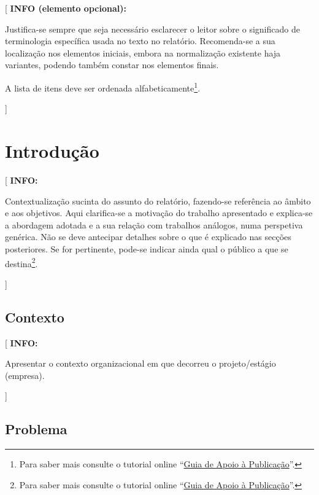 \documentclass[11pt,a4paper]{report}
\newenvironment{info}[1]{\vspace*{6mm}\color{blue}[ \textbf{INFO:} \begin{em} #1}
                        {\vspace*{3mm}\end{em} ]}
\newenvironment{infoopt}[1]{\vspace*{6mm}\color{blue}[ \textbf{INFO (elemento opcional):} \begin{em} #1}
                        {\vspace*{3mm}\end{em} ]}
\begin{document}
\begin{infoopt}
Justifica-se sempre que seja necessário esclarecer o leitor sobre o
significado de terminologia específica usada no texto no relatório.
Recomenda-se a sua localização nos elementos iniciais, embora na
normalização existente haja variantes, podendo também constar nos
elementos finais.

A lista de itens deve ser ordenada alfabeticamente\footnote{%
Para saber mais consulte o tutorial online 
``\href{https://docs.google.com/document/d/1TDC1behVq8x7fQL4CcPEEh_np5GXviJevQxnQ9gbiJs/edit}
{Guia de Apoio à Publicação}''.}.
\end{infoopt}


\chapter{Introdução}

\pagestyle{fancy}
\setcounter{page}{1}

\begin{info}
Contextualização sucinta do assunto do relatório, fazendo-se
referência ao âmbito e aos objetivos.
Aqui clarifica-se a motivação do trabalho apresentado e explica-se a
abordagem adotada e a sua relação com trabalhos análogos, numa
perspetiva genérica.
Não se deve antecipar detalhes sobre o que é explicado nas secções
posteriores. 
Se for pertinente, pode-se indicar ainda qual o público a que se
destina\footnote{%
Para saber mais consulte o tutorial online 
``\href{https://docs.google.com/document/d/1TDC1behVq8x7fQL4CcPEEh_np5GXviJevQxnQ9gbiJs/edit}
{Guia de Apoio à Publicação}''.}.
\end{info}

\section{Contexto}

\begin{info}
Apresentar o contexto organizacional em que decorreu o projeto/estágio (empresa).
\end{info}

\section{Problema}
\end{document}
